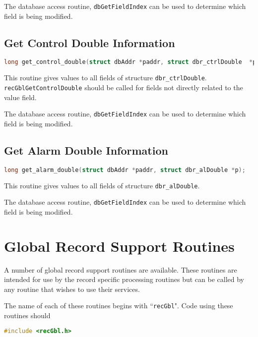 The database access routine, \verb|dbGetFieldIndex| can be used to determine which field is being modified.

\subsection{Get Control Double Information}

\begin{lstlisting}[language=C]
long get_control_double(struct dbAddr *paddr, struct dbr_ctrlDouble  *p);
\end{lstlisting}

This routine gives values to all fields of structure \verb|dbr_ctrlDouble|.
\verb|recGblGetControlDouble| should be called for fields not directly related to the value field.

The database access routine, \verb|dbGetFieldIndex| can be used to determine which field is being modified.

\subsection{Get Alarm Double Information}

\begin{lstlisting}[language=C]
long get_alarm_double(struct dbAddr *paddr, struct dbr_alDouble *p);
\end{lstlisting}

This routine gives values to all fields of structure \verb|dbr_alDouble|.

The database access routine, \verb|dbGetFieldIndex| can be used to determine which field is being modified.

\section{Global Record Support Routines}

A number of global record support routines are available.
These routines are intended for use by the record specific processing routines but can be called by any routine that wishes to use their services.

The name of each of these routines begins with ``\verb|recGbl|".
Code using these routines should
\begin{lstlisting}[language=C]
#include <recGbl.h>
\end{lstlisting}

